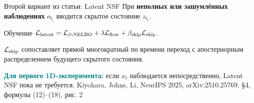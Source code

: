 \documentclass[10pt,aspectratio=169]{beamer}
\newcommand{\nsfsrc}[1]{\vfill{\tiny\color{graytext}Kiyohara, Johns, Li, NeurIPS 2025, arXiv:2510.25769, #1}}
\begin{document}
\begin{frame}{Второй вариант из статьи: Latent NSF}
\vspace{0.12cm}
При \textbf{неполных или зашумлённых наблюдениях} $o_{t_i}$ вводится скрытое состояние $z_{t_i}$.
\vspace{0.16cm}
\begin{center}
\end{center}
\vspace{0.10cm}
\begin{block}{Обучение}
$\displaystyle \mathcal L_{\rm latent}=\mathcal L_{\beta\text{-NELBO}}
+\lambda\mathcal L_{\mathrm{flow}}+\beta_{\rm skip}\mathcal L_{\rm skip}$.
\par\smallskip
$\mathcal L_{\rm skip}$ сопоставляет прямой многократный по времени переход с апостериорным распределением будущего скрытого состояния.
\end{block}
\small\textcolor{teal}{\bfseries Для первого 1D-эксперимента:} если $x_t$ наблюдается непосредственно, Latent NSF пока не требуется.
\nsfsrc{\S 4, формулы (12)--(18), рис. 2}
\end{frame}
\end{document}
